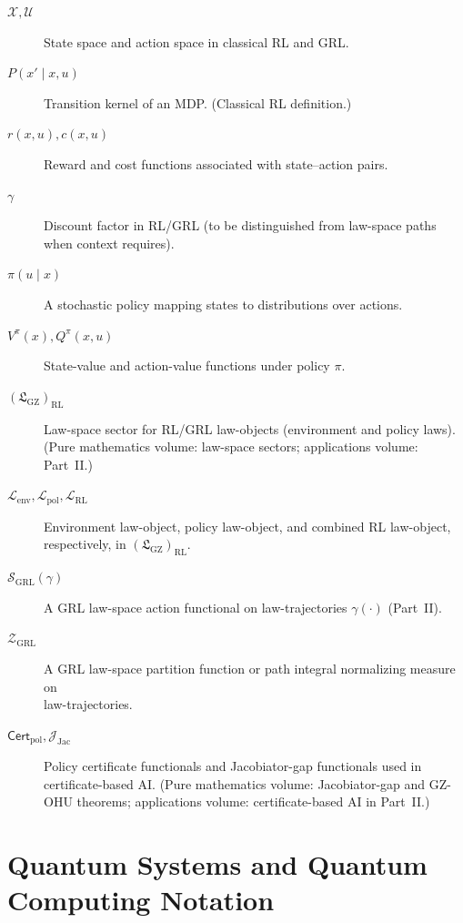 \documentclass[11pt]{book}
\newcommand{\GZLS}{\ensuremath{\mathfrak{L}_{\mathrm{GZ}}}}
\theoremstyle{plain}
\theoremstyle{definition}
\theoremstyle{remark}
\begin{document}
\begin{description}
  \item[$\mathcal{X},\mathcal{U}$]
    State space and action space in classical RL and GRL.
  \item[$P(x' \mid x,u)$]
    Transition kernel of an MDP. (Classical RL definition.)
  \item[$r(x,u),c(x,u)$]
    Reward and cost functions associated with state--action pairs.
  \item[$\gamma$]
    Discount factor in RL/GRL (to be distinguished from law-space
    paths when context requires).
  \item[$\pi(u\mid x)$]
    A stochastic policy mapping states to distributions over actions.
  \item[$V^\pi(x),Q^\pi(x,u)$]
    State-value and action-value functions under policy $\pi$.
  \item[$(\GZLS)_{\mathrm{RL}}$]
    Law-space sector for RL/GRL law-objects (environment and policy
    laws). (Pure mathematics volume: law-space sectors; applications
    volume: Part~II.)
  \item[$\mathcal{L}_{\mathrm{env}},
         \mathcal{L}_{\mathrm{pol}},
         \mathcal{L}_{\mathrm{RL}}$]
    Environment law-object, policy law-object, and combined RL
    law-object, respectively, in $(\GZLS)_{\mathrm{RL}}$.
  \item[$\mathcal{S}_{\mathrm{GRL}}(\gamma)$]
    A GRL law-space action functional on law-trajectories
    $\gamma(\cdot)$ (Part~II).
  \item[$\mathcal{Z}_{\mathrm{GRL}}$]
    A GRL law-space partition function or path integral normalizing
    measure on \\law-trajectories.
  \item[$\mathsf{Cert}_{\mathrm{pol}},
         \mathcal{J}_{\mathrm{Jac}}$]
    Policy certificate functionals and Jacobiator-gap functionals
    used in certificate-based AI. (Pure mathematics volume:
    Jacobiator-gap and GZ-OHU theorems; applications volume:
    certificate-based AI in Part~II.)
\end{description}

\section*{Quantum Systems and Quantum Computing Notation}
\end{document}
